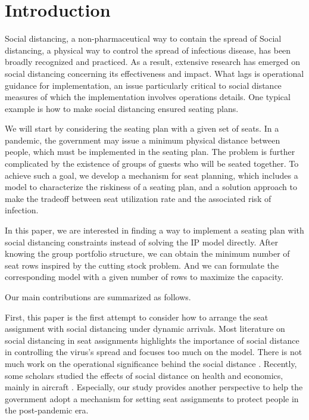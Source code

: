 \section{Introduction}

Social distancing, a non-pharmaceutical way to contain the spread of Social distancing, a physical way to control the spread of infectious disease, has been broadly recognized and practiced. As a result, extensive research has emerged on social distancing concerning its effectiveness and impact. What lags is operational guidance for implementation, an issue particularly critical to social distance measures of which the implementation involves operations details. One typical example is how to make social distancing ensured seating plans.

We will start by considering the seating plan with a given set of seats. In a pandemic, the government may issue a minimum physical distance between people, which must be implemented in the seating plan. The problem is further complicated by the existence of groups of guests who will be seated together. To achieve such
a goal, we develop a mechanism for seat planning, which includes a model to characterize the riskiness of a seating plan, and a solution approach to make the tradeoff between seat utilization rate and the associated risk of infection.

In this paper, we are interested in finding a way to implement a seating plan with social distancing constraints instead of solving the IP model directly.
After knowing the group portfolio structure, we can obtain the minimum number of seat rows inspired by the cutting stock problem.
And we can formulate the corresponding model with a given number of rows to maximize the capacity.


Our main contributions are summarized as follows.

First, this paper is the first attempt to consider how to arrange the seat assignment with social distancing under dynamic arrivals. 
Most literature on social distancing in seat assignments highlights the importance of social distance in controlling the virus's spread and focuses too much on the model. There is not much work on the operational significance behind the social distance \cite{barry2021optimal} \cite{fischetti2021safe}.
Recently, some scholars studied the effects of social distance on health and economics, mainly in aircraft \cite{salari2020social} \cite{ghorbani2020model}. Especially, our study provides another perspective to help the government adopt a mechanism for setting seat assignments to protect people 
in the post-pandemic era.

